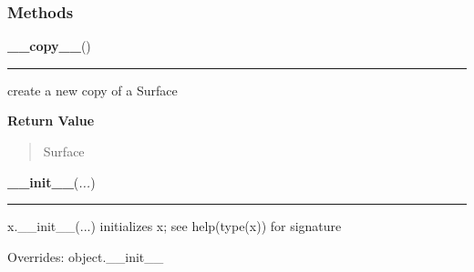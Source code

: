 
  \subsubsection{Methods}

    \label{pygame:Surface:__copy__}

    \vspace{0.5ex}

\hspace{.8\funcindent}\begin{boxedminipage}{\funcwidth}

    \raggedright \textbf{\_\_copy\_\_}()

    \vspace{-1.5ex}

    \rule{\textwidth}{0.5\fboxrule}
\setlength{\parskip}{2ex}
    create a new copy of a Surface

\setlength{\parskip}{1ex}
      \textbf{Return Value}
    \vspace{-1ex}

      \begin{quote}
      Surface

      \end{quote}

    \end{boxedminipage}

    \vspace{0.5ex}

\hspace{.8\funcindent}\begin{boxedminipage}{\funcwidth}

    \raggedright \textbf{\_\_init\_\_}(\textit{...})

    \vspace{-1.5ex}

    \rule{\textwidth}{0.5\fboxrule}
\setlength{\parskip}{2ex}
    x.\_\_init\_\_(...) initializes x; see help(type(x)) for signature

\setlength{\parskip}{1ex}
      Overrides: object.\_\_init\_\_

    \end{boxedminipage}

    \vspace{0.5ex}

